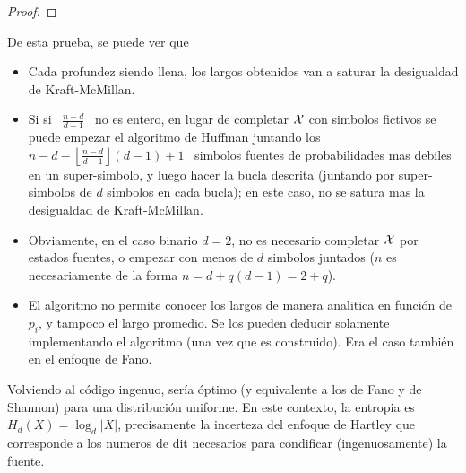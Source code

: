 \begin{proof}
\end{proof}
%
De esta  prueba, se puede ver que
%
\begin{itemize}
\item  Cada  profundez siendo  llena,  los largos  obtenidos  van  a saturar  la
  desigualdad de Kraft-McMillan.
\item Si si \ $$ \ no es entero, en lugar de completar $\X$ con
  simbolos fictivos se puede empezar el algoritmo de Huffman juntando los \ $n -
  d - \left\lfloor {} \right\rfloor (d-1) + 1$ \ simbolos fuentes
  de  probabilidades mas debiles  en un  super-simbolo, y  luego hacer  la bucla
  descrita (juntando por super-simbolos de  $d$ simbolos en cada bucla); en este
  caso, no se satura mas la desigualdad de Kraft-McMillan.
%
\item Obviamente, en el caso binario $d = 2$, no es necesario completar $\X$ por
  estados  fuentes,  o  empezar con  menos  de  $d$  simbolos juntados  ($n$  es
  necesariamente de la forma $n = d + q (d-1) = 2 + q$).
%
\item  El  algoritmo  no permite  conocer  los  largos  de manera  analitica  en
  funci\'on  de $p_i$,  y  tampoco el  largo  promedio.  Se  los pueden  deducir
  solamente implementando el algoritmo (una  vez que es construido). Era el caso
  tambi\'en en el enfoque de Fano.
\end{itemize}

Volviendo al c\'odigo  ingenuo, ser\'ia \'optimo (y equivalente a  los de Fano y
de Shannon) para  una distribuci\'on uniforme. En este  contexto, la entropia es
$H_d(X)  = \log_d |X|$,  precisamente la  incerteza del  enfoque de  Hartley que
corresponde a los numeros de  dit necesarios para condificar (ingenuosamente) la
fuente.

